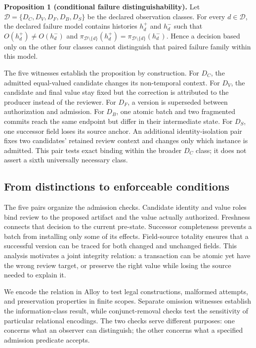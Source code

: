 \documentclass[preprint,12pt,authoryear]{elsarticle}
\begin{document}
\textbf{Proposition 1 (conditional failure distinguishability).} Let $\mathcal D=\{D_C,D_V,D_F,D_B,D_S\}$ be the declared observation classes. For every $d\in\mathcal D$, the declared failure model contains histories $h_d^+$ and $h_d^-$ such that $O(h_d^+)\ne O(h_d^-)$ and $\pi_{\mathcal D\setminus\{d\}}(h_d^+)=\pi_{\mathcal D\setminus\{d\}}(h_d^-)$. Hence a decision based only on the other four classes cannot distinguish that paired failure family within this model.

The five witnesses establish the proposition by construction. For $D_C$, the admitted equal-valued candidate changes its non-temporal context. For $D_V$, the candidate and final value stay fixed but the correction is attributed to the producer instead of the reviewer. For $D_F$, a version is superseded between authorization and admission. For $D_B$, one atomic batch and two fragmented commits reach the same endpoint but differ in their intermediate state. For $D_S$, one successor field loses its source anchor. An additional identity-isolation pair fixes two candidates' retained review context and changes only which instance is admitted. This pair tests exact binding within the broader $D_C$ class; it does not assert a sixth universally necessary class.

\subsection{From distinctions to enforceable conditions}

The five pairs organize the admission checks. Candidate identity and value roles bind review to the proposed artifact and the value actually authorized. Freshness connects that decision to the current pre-state. Successor completeness prevents a batch from installing only some of its effects. Field-source totality ensures that a successful version can be traced for both changed and unchanged fields. This analysis motivates a joint integrity relation: a transaction can be atomic yet have the wrong review target, or preserve the right value while losing the source needed to explain it.

We encode the relation in Alloy to test legal constructions, malformed attempts, and preservation properties in finite scopes. Separate omission witnesses establish the information-class result, while conjunct-removal checks test the sensitivity of particular relational encodings. The two checks serve different purposes: one concerns what an observer can distinguish; the other concerns what a specified admission predicate accepts.
\end{document}
